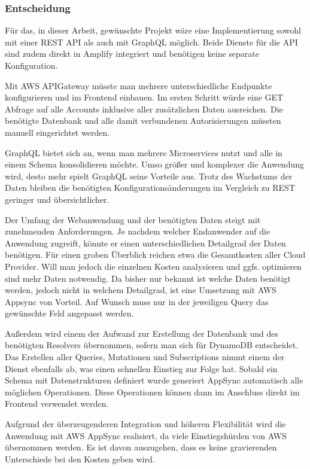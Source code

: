 \subsubsection{Entscheidung}
Für das, in dieser Arbeit, gewünschte Projekt wäre eine Implementierung sowohl mit einer REST API als auch mit GraphQL möglich.
Beide Dienste für die API sind zudem direkt in Amplify integriert und benötigen keine separate Konfiguration.

Mit AWS APIGateway müsste man mehrere unterschiedliche Endpunkte konfigurieren und im Frontend einbauen.
Im ersten Schritt würde eine GET Abfrage auf alle Accounts inklusive aller zusätzlichen Daten ausreichen.
Die benötigte Datenbank und alle damit verbundenen Autorisierungen müssten manuell eingerichtet werden.

GraphQL bietet sich an, wenn man mehrere Microservices nutzt und alle in einem Schema konsolidieren möchte.
Umso größer und komplexer die Anwendung wird, desto mehr spielt GraphQL seine Vorteile aus.
Trotz des Wachstums der Daten bleiben die benötigten Konfigurationsänderungen im Vergleich zu REST geringer und übersichtlicher.

Der Umfang der Webanwendung und der benötigten Daten steigt mit zunehmenden Anforderungen.
Je nachdem welcher Endanwender auf die Anwendung zugreift, könnte er einen unterschiedlichen Detailgrad der Daten benötigen.
Für einen groben Überblick reichen etwa die Gesamtkosten aller Cloud Provider.
Will man jedoch die einzelnen Kosten analysieren und ggfs. optimieren sind mehr Daten notwendig.
Da bisher nur bekannt ist welche Daten benötigt werden, jedoch nicht in welchem Detailgrad, ist eine Umsetzung mit AWS Appsync von Vorteil.
Auf Wunsch muss nur in der jeweiligen Query das gewünschte Feld angepasst werden.

Außerdem wird einem der Aufwand zur Erstellung der Datenbank und des benötigten Resolvers übernommen, sofern man sich für DynamoDB entscheidet.
Das Erstellen aller Queries, Mutationen und Subscriptions nimmt einem der Dienst ebenfalls ab, was einen schnellen Einstieg zur Folge hat.
Sobald ein Schema mit Datenstrukturen definiert wurde generiert AppSync automatisch alle möglichen Operationen.
Diese Operationen können dann im Anschluss direkt im Frontend verwendet werden.

Aufgrund der überzeugenderen Integration und höheren Flexibilität wird die Anwendung mit AWS AppSync realisiert, da viele Einstiegshürden von AWS übernommen werden.
Es ist davon auszugehen, dass es keine gravierenden Unterschiede bei den Kosten geben wird.




